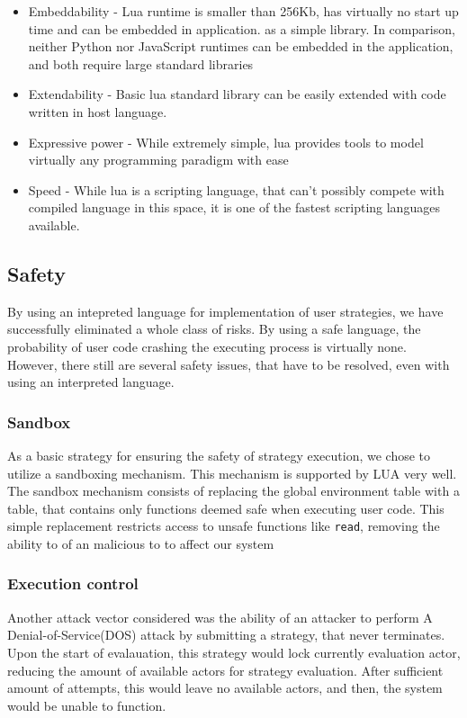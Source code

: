\begin{itemize}
    \item Embeddability - Lua runtime is smaller than 256Kb, has virtually no start up time and can be embedded in application.
    as a simple library. In comparison, neither Python nor JavaScript runtimes can be embedded in the application, and both
    require large standard libraries
    \item Extendability - Basic lua standard library can be easily extended with code written in host language.
    \item Expressive power - While extremely simple, lua provides tools to model virtually any programming paradigm with ease
    \item Speed - While lua is a scripting language, that can't possibly compete with compiled language in this space,
    it is one of the fastest scripting languages available.
\end{itemize}

\subsection{Safety}
By using an intepreted language for implementation of user strategies, we have successfully eliminated a whole
class of risks. By using a safe language, the probability of user code crashing the executing process is virtually
none. However, there still are several safety issues, that have to be resolved, even with using an interpreted language.

\subsubsection{Sandbox}
As a basic strategy for ensuring the safety of strategy execution, we chose to utilize a sandboxing mechanism.
This mechanism is supported by LUA very well. The sandbox mechanism consists of replacing the global environment table
with a table, that contains only functions deemed safe when executing user code. This simple replacement
restricts access to unsafe functions like \verb|read|, removing the ability to of an malicious to to
affect our system

\subsubsection{Execution control}
Another attack vector considered was the ability of an attacker to perform A Denial-of-Service(DOS) attack by
submitting a strategy, that never terminates. Upon the start of evalauation, this strategy would lock
currently evaluation actor, reducing the amount of available actors for strategy evaluation. After
sufficient amount of attempts, this would leave no available actors, and then, the system would be unable
to function.


